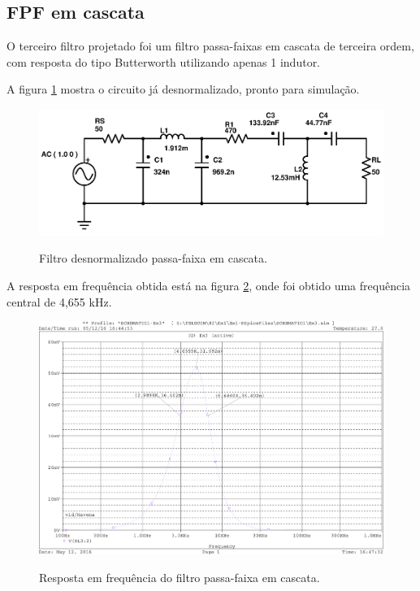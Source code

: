 \subsection{FPF em cascata}
O terceiro filtro projetado foi um filtro passa-faixas em cascata de terceira 
ordem, com resposta do tipo Butterworth utilizando apenas 1 indutor.

A figura \ref{fig:fpf-cascata} mostra o circuito já desnormalizado, pronto para 
simulação.

\begin{figure}[!h]
  \centering
  
  \includegraphics[scale=0.4]{Imagens/fpf-cascata}
  \label{fig:fpf-cascata}
  \caption{Filtro desnormalizado passa-faixa em cascata.}
\end{figure}

A resposta em frequência obtida está na figura \ref{fig:resp_freq_3}, onde foi 
obtido uma frequência central de 4,655 kHz. 

\begin{figure}[!h]
  \centering
  
  \includegraphics[scale=0.3]{Imagens/resp_freq_3}
  \label{fig:resp_freq_3}
  \caption{Resposta em frequência do filtro passa-faixa em cascata.}
\end{figure}

